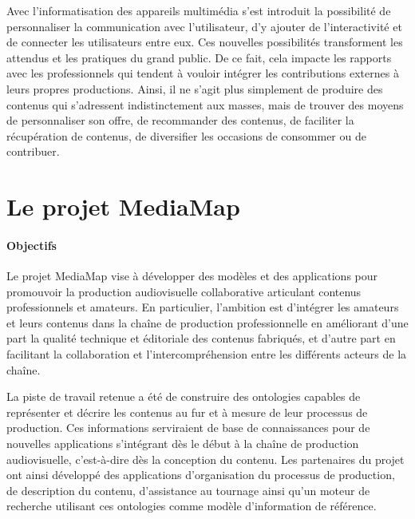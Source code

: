 Avec l'informatisation des appareils multimédia s’est introduit la possibilité de personnaliser la communication avec l'utilisateur, d'y ajouter de l'interactivité et de connecter les utilisateurs entre eux. 
Ces nouvelles possibilités transforment les attendus et les pratiques du grand public. 
De ce fait, cela impacte les rapports avec les professionnels qui tendent à vouloir intégrer les contributions externes à leurs propres productions. 
Ainsi, il ne s’agit plus simplement de produire des contenus qui s'adressent indistinctement aux masses, mais de trouver des moyens de personnaliser son offre, de recommander des contenus, de faciliter la récupération de contenus, de diversifier les occasions de consommer ou de contribuer.








\section{Le projet MediaMap}\label{sec:mm}
\paragraph{Objectifs}
Le projet MediaMap vise à développer des modèles et des applications pour promouvoir la production audiovisuelle collaborative articulant contenus professionnels et amateurs. 
En particulier, l'ambition est d'intégrer les amateurs et leurs contenus dans la chaîne de production professionnelle en améliorant d'une part la qualité technique et éditoriale des contenus fabriqués, et d'autre part en facilitant la collaboration et l'intercompréhension entre les différents acteurs de la chaîne.

La piste de travail retenue a été de construire des ontologies capables de représenter et décrire les contenus au fur et à mesure de leur processus de production. 
Ces informations serviraient de base de connaissances pour de nouvelles applications s'intégrant dès le début à la chaîne de production audiovisuelle, c'est-à-dire dès la conception du contenu. 
Les partenaires du projet ont ainsi développé des applications d'organisation du processus de production, de description du contenu, d'assistance au tournage ainsi qu'un moteur de recherche utilisant ces ontologies comme modèle d'information de référence.

